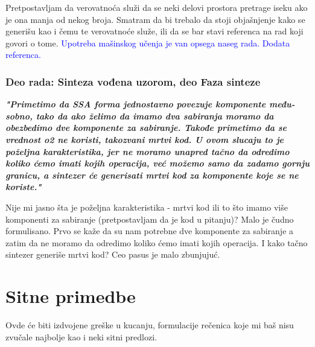 \documentclass[a4paper]{report}
\newcommand{\odgovor}[1]{\textcolor{blue}{#1}}
\begin{document}
Pretpostavljam da verovatnoća služi da se neki delovi prostora pretrage iseku ako je ona manja od nekog broja. Smatram da bi trebalo da stoji objašnjenje kako se generišu kao i čemu te verovatnoće služe, ili da se bar stavi referenca na rad koji govori o tome.
\odgovor {Upotreba mašinskog učenja je van opsega naseg rada. Dodata referenca.}

\subsubsection{Deo rada: Sinteza vođena uzorom, deo Faza sinteze}
\textbf{\textit{"Primetimo da SSA forma jednostavno povezuje komponente među-sobno, tako da ako želimo da imamo dva sabiranja moramo da obezbedimo dve komponente za sabiranje. Takođe primetimo da se vrednost o2 ne koristi, takozvani mrtvi kod. U ovom slucaju to je poželjna karakteristika,
jer ne moramo unapred tačno da odredimo koliko ćemo imati kojih operacija, već možemo samo da zadamo gornju granicu, a sintezer će generisati mrtvi kod za komponente koje se ne koriste."}}

Nije mi jasno šta je poželjna karakteristika - mrtvi kod ili to što imamo više komponenti za sabiranje (pretpostavljam da je kod u pitanju)? Malo je čudno formulisano. Prvo se kaže da su nam potrebne dve komponente za sabiranje a zatim da ne moramo da odredimo koliko ćemo imati kojih operacija. I kako tačno sintezer generiše mrtvi kod? Ceo pasus je malo zbunjujuć.



\section{Sitne primedbe}
Ovde će biti izdvojene greške u kucanju, formulacije rečenica koje mi baš nisu zvučale najbolje kao i neki sitni predlozi.
\end{document}
